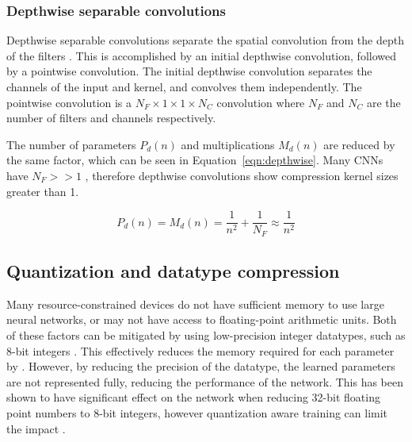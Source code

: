 \documentclass{article}
\begin{document}
	\subsubsection{Depthwise separable convolutions}	
	
	Depthwise separable convolutions separate the spatial convolution from the depth of the filters \cite{mobilenet,xception}. This is accomplished by an initial depthwise convolution, followed by a pointwise convolution. The initial depthwise convolution separates the channels of the input and kernel, and convolves them independently. The pointwise convolution is a $N_F \times 1 \times 1 \times N_C$ convolution where $N_F$ and $N_C$ are the number of filters and channels respectively. 
	
	The number of parameters $P_d(n)$ and multiplications $M_d(n)$ are reduced by the same factor, which can be seen in Equation~\ref{eqn:depthwise}. Many CNNs have $N_F >> 1$ \cite{vgg, yolo, resnetv2}, therefore depthwise convolutions show compression kernel sizes greater than 1. 

	\begin{equation} \label{eqn:depthwise}
		P_d(n) = M_d(n) = \frac{1}{n^2} + \frac{1}{N_F} \approx \frac{1}{n^2}
	\end{equation}
	
	
	\subsection{Quantization and datatype compression}
	
	Many resource-constrained devices do not have sufficient memory to use large neural networks, or may not have access to floating-point arithmetic units. Both of these factors can be mitigated by using low-precision integer datatypes, such as 8-bit integers \cite{scalable8bit,quantfriendlymobilenet}. This effectively reduces the memory required for each parameter by . However, by reducing the precision of the datatype, the learned parameters are not represented fully, reducing the performance of the network. This has been shown to have significant effect on the network when reducing 32-bit floating point numbers to 8-bit integers, however quantization aware training can limit the impact \cite{scalable8bit}. 
	
\end{document}
